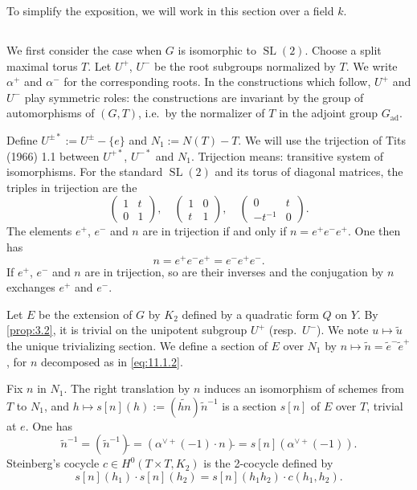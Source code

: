 \documentclass[11pt,a4paper]{article}
\theoremstyle{plain}
\theoremstyle{definition}
\newcommand{\ad}{\mathrm{ad}}
\DeclareMathOperator{\SL}{SL}
\begin{document}
To simplify the exposition, we will work in this section over a field $k$.

\subsection{}
We first consider the case when $G$ is isomorphic to $\SL(2)$. Choose a split maximal torus $T$. Let $U^+$, $U^-$ be the root subgroups normalized by $T$. We write $\alpha^+$ and $\alpha^-$ for the corresponding roots. In the constructions which follow, $U^+$ and $U^-$ play symmetric roles: the constructions are invariant by the group of automorphisms of $(G,T)$, i.e.~by the normalizer of $T$ in the adjoint group $G_\ad$.

Define $U^{\pm*} := U^\pm - \{e\}$ and $N_1 := N(T) - T$. We will use the trijection of Tits (1966) 1.1 between $U^{+*}$, $U^{-*}$ and $N_1$. Trijection means: transitive system of isomorphisms. For the standard $\SL(2)$ and its torus of diagonal matrices, the triples in trijection are the
\begin{equation}\label{eq:11.1.1}
\begin{pmatrix} 1 & t \\ 0 & 1 \end{pmatrix}, \quad \begin{pmatrix} 1 & 0 \\ t & 1 \end{pmatrix}, \quad \begin{pmatrix} 0 & t \\ -t^{-1} & 0 \end{pmatrix}.
\end{equation}
The elements $e^+$, $e^-$ and $n$ are in trijection if and only if $n = e^+ e^- e^+$. One then has
\begin{equation}\label{eq:11.1.2}
n = e^+ e^- e^+ = e^- e^+ e^-.
\end{equation}
If $e^+$, $e^-$ and $n$ are in trijection, so are their inverses and the conjugation by $n$ exchanges $e^+$ and $e^-$.

Let $E$ be the extension of $G$ by $K_2$ defined by a quadratic form $Q$ on $Y$. By \ref{prop:3.2}, it is trivial on the unipotent subgroup $U^+$ (resp.~$U^-$). We note $u \mapsto \tilde{u}$ the unique trivializing section. We define a section of $E$ over $N_1$ by $n \mapsto \tilde{n} = \tilde{e}^- \tilde{e}^+$, for $n$ decomposed as in \eqref{eq:11.1.2}.

Fix $n$ in $N_1$. The right translation by $n$ induces an isomorphism of schemes from $T$ to $N_1$, and $h \mapsto s[n](h) := (\widetilde{hn}) \tilde{n}^{-1}$ is a section $s[n]$ of $E$ over $T$, trivial at $e$. One has
\begin{equation}\label{eq:11.1.3}
\tilde{n}^{-1} = (\tilde{n}^{-1})\tilde{} = (\alpha^{\vee+}(-1) \cdot n)\tilde{} = s[n](\alpha^{\vee+}(-1)).
\end{equation}
Steinberg's cocycle $c \in H^0(T \times T, K_2)$ is the 2-cocycle defined by
\begin{equation}\label{eq:11.1.4}
s[n](h_1) \cdot s[n](h_2) = s[n](h_1 h_2) \cdot c(h_1, h_2).
\end{equation}
\end{document}

